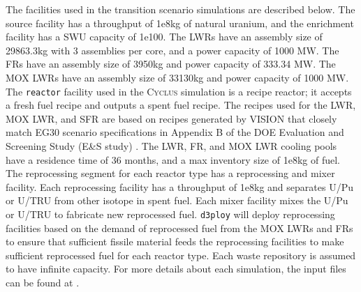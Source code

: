 \documentclass[answers,11pt]{exam}
\newcommand{\Cyclus}{\textsc{Cyclus}\xspace}%
\newcommand{\deploy}{\texttt{d3ploy}\xspace}%
\begin{document}
\begin{questions}
\begin{solution}
The facilities used in the transition scenario simulations are described below. 
The source facility has a throughput of 1e8kg of natural uranium, and the enrichment 
facility has a SWU capacity of 1e100. The LWRs have an 
assembly size of 29863.3kg with 3 assemblies per core, and a power capacity of 1000 MW. 
The FRs have an assembly size  of 3950kg and power capacity of 333.34 MW.
The MOX LWRs have an assembly size of 33130kg and power capacity of 1000 MW. 
The \texttt{reactor} facility used in the \Cyclus simulation 
is a recipe reactor; it accepts a fresh fuel recipe and outputs 
a spent fuel recipe. 
The recipes used for the LWR, MOX LWR, and 
SFR are based on recipes generated by VISION 
\cite{bae_arfctransition-scenarios_2019}
that closely match EG30 scenario specifications in 
Appendix B of the DOE Evaluation and Screening Study 
(E\&S study) \cite{wigeland_nuclear_2014}. 
The LWR, FR, and MOX LWR cooling pools have a residence time of 36 months, and a max 
inventory size of 1e8kg of fuel. 
The reprocessing segment for each reactor type has a reprocessing and mixer facility. 
Each reprocessing facility has a throughput of 1e8kg and separates U/Pu or U/TRU from 
other isotope in spent fuel. 
Each mixer facility mixes the U/Pu or U/TRU to fabricate new reprocessed fuel.  
\deploy will deploy reprocessing facilities based on the demand of reprocessed fuel 
from the MOX LWRs and FRs to ensure that sufficient fissile material 
feeds the reprocessing facilities to make sufficient reprocessed fuel 
for each reactor type. 
Each waste repository is assumed to have infinite capacity. 
For more details about each simulation, the input files can be found at 
\cite{bae_arfctransition-scenarios_2019}. 
\end{solution}

\end{questions}


  
\end{document}
